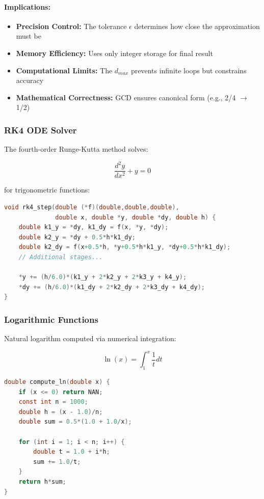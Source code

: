 \documentclass{article}
\begin{document}
\paragraph{Implications:}
\begin{itemize}
\item \textbf{Precision Control:} The tolerance $\epsilon$ determines how close the approximation must be
\item \textbf{Memory Efficiency:} Uses only integer storage for final result
\item \textbf{Computational Limits:} The $d_{max}$ prevents infinite loops but constrains accuracy
\item \textbf{Mathematical Correctness:} GCD ensures canonical form (e.g., 2/4 $\rightarrow$ 1/2)
\end{itemize}

\subsubsection{RK4 ODE Solver}
The fourth-order Runge-Kutta method solves:

\[ \frac{d^2y}{dx^2} + y = 0 \]

for trigonometric functions:

\begin{lstlisting}[language=C,caption=RK4 Implementation]
void rk4_step(double (*f)(double,double,double), 
              double x, double *y, double *dy, double h) {
    double k1_y = *dy, k1_dy = f(x, *y, *dy);
    double k2_y = *dy + 0.5*h*k1_dy;
    double k2_dy = f(x+0.5*h, *y+0.5*h*k1_y, *dy+0.5*h*k1_dy);
    // Additional stages...
    
    *y += (h/6.0)*(k1_y + 2*k2_y + 2*k3_y + k4_y);
    *dy += (h/6.0)*(k1_dy + 2*k2_dy + 2*k3_dy + k4_dy);
}
\end{lstlisting}

\subsubsection{Logarithmic Functions}
Natural logarithm computed via numerical integration:

\[ \ln(x) = \int_1^x \frac{1}{t} dt \]

\begin{lstlisting}[language=C,caption=Logarithm Implementation]
double compute_ln(double x) {
    if (x <= 0) return NAN;
    const int n = 1000;
    double h = (x - 1.0)/n;
    double sum = 0.5*(1.0 + 1.0/x);
    
    for (int i = 1; i < n; i++) {
        double t = 1.0 + i*h;
        sum += 1.0/t;
    }
    return h*sum;
}
\end{lstlisting}
\end{document}
